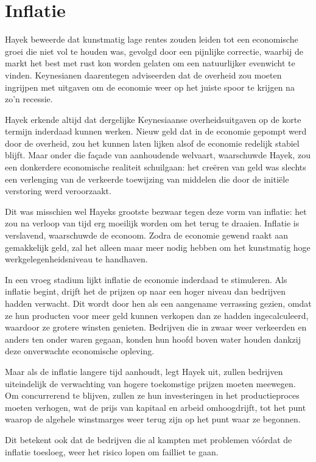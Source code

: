 \documentclass[smalldemyvopaper,11pt,twoside,onecolumn,openright,extrafontsizes,hidelinks]{memoir}
\begin{document}
\section{Inflatie}\label{inflatie}

Hayek beweerde dat kunstmatig lage rentes zouden leiden tot een
economische groei die niet vol te houden was, gevolgd door een pijnlijke
correctie, waarbij de markt het best met rust kon worden gelaten om een
natuurlijker evenwicht te vinden. Keynesianen daarentegen adviseerden
dat de overheid zou moeten ingrijpen met uitgaven om de economie weer op
het juiste spoor te krijgen na zo'n recessie.

Hayek erkende altijd dat dergelijke Keynesiaanse overheidsuitgaven op de
korte termijn inderdaad kunnen werken. Nieuw geld dat in de economie
gepompt werd door de overheid, zou het kunnen laten lijken alsof de
economie redelijk stabiel blijft. Maar onder die façade van aanhoudende
welvaart, waarschuwde Hayek, zou een donkerdere economische realiteit
schuilgaan: het creëren van geld was slechts een verlenging van de
verkeerde toewijzing van middelen die door de initiële verstoring werd
veroorzaakt.

Dit was misschien wel Hayeks grootste bezwaar tegen deze vorm van
inflatie: het zou na verloop van tijd erg moeilijk worden om het terug
te draaien. Inflatie is verslavend, waarschuwde de econoom. Zodra de
economie gewend raakt aan gemakkelijk geld, zal het alleen maar meer
nodig hebben om het kunstmatig hoge werkgelegenheidsniveau te handhaven.

In een vroeg stadium lijkt inflatie de economie inderdaad te stimuleren.
Als inflatie begint, drijft het de prijzen op naar een hoger niveau dan
bedrijven hadden verwacht. Dit wordt door hen als een aangename
verrassing gezien, omdat ze hun producten voor meer geld kunnen verkopen
dan ze hadden ingecalculeerd, waardoor ze grotere winsten genieten.
Bedrijven die in zwaar weer verkeerden en anders ten onder waren gegaan,
konden hun hoofd boven water houden dankzij deze onverwachte economische
opleving.

Maar als de inflatie langere tijd aanhoudt, legt Hayek uit, zullen
bedrijven uiteindelijk de verwachting van hogere toekomstige prijzen
moeten meewegen. Om concurrerend te blijven, zullen ze hun investeringen
in het productieproces moeten verhogen, wat de prijs van kapitaal en
arbeid omhoogdrijft, tot het punt waarop de algehele winstmarges weer
terug zijn op het punt waar ze begonnen.

Dit betekent ook dat de bedrijven die al kampten met problemen vóórdat
de inflatie toesloeg, weer het risico lopen om failliet te gaan.
\end{document}
